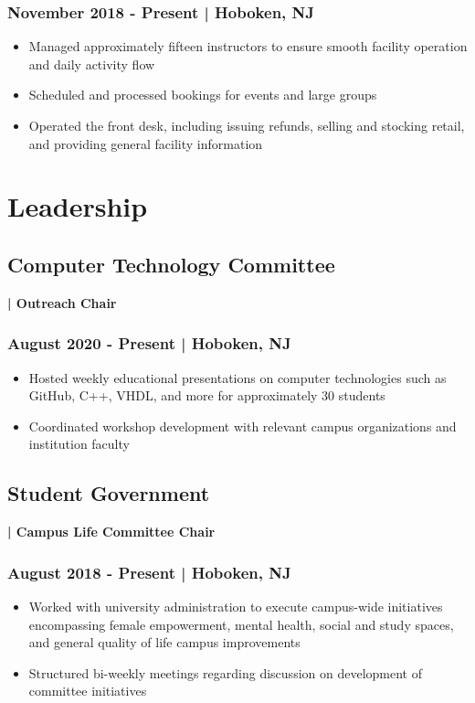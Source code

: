 \documentclass[a4paper, 11pt]{article}
\newenvironment{tightemize}{\vspace{-\topsep}
\begin{itemize}[leftmargin=1em]\itemsep1pt \parskip0pt \parsep0pt}
{\end{itemize}\vspace{-\topsep}}
\begin{document}
\begin{minipage}[h]{0.63\textwidth}
\subsubsection{November 2018 - Present | Hoboken, NJ}
\vspace{-0.5em}
\begin{tightemize}
\item{\textcolor{location}{Managed approximately fifteen instructors to ensure smooth facility operation and daily activity flow}}
\item{\textcolor{location}{Scheduled and processed bookings for events and large groups}}
\item{\textcolor{location}{Operated the front desk, including issuing refunds, selling and stocking retail, and providing general facility information}}
\end{tightemize}
\vspace{-1em}
\section{Leadership}
\subsection{Computer Technology Committee}\textbf{\textcolor{location}{| Outreach Chair}} 
\subsubsection{August 2020 - Present | Hoboken, NJ}
\vspace{-0.5em}
\begin{tightemize}
\item{\textcolor{location}{Hosted weekly educational presentations on computer technologies such as GitHub, C++, VHDL, and more for approximately 30 students}}
\item{\textcolor{location}{Coordinated workshop development with relevant campus organizations and institution faculty}}
\end{tightemize}
\vspace{-1em}
\subsection{Student Government}\textbf{\textcolor{location}{| Campus Life Committee Chair}}
\subsubsection{August 2018 - Present | Hoboken, NJ}
\vspace{-0.5em}
\begin{tightemize}
\item{\textcolor{location}{Worked with university administration to execute campus-wide initiatives encompassing female empowerment, mental health, social and study spaces, and general quality of life campus improvements}}
\item{\textcolor{location}{Structured bi-weekly meetings regarding discussion on development of committee initiatives}}
\end{tightemize}
\vspace{-1em}

\end{minipage}
\end{document}
